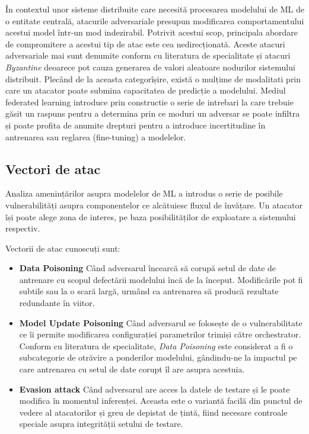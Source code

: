 \documentclass[../../main.tex]{subfiles}
\begin{document}
    În contextul unor sisteme distribuite care necesită procesarea modelului de ML de o entitate centrală, atacurile adversariale presupun modificarea comportamentului acestui model într-un mod indezirabil. Potrivit acestui scop, principala abordare de compromitere a acestui tip de atac este cea nedirecționată. 
    Aceste atacuri adversariale mai sunt denumite conform cu literatura de specialitate și atacuri \textit{Byzantine} deoarece pot cauza generarea de valori aleatoare nodurilor sistemului distribuit. 
    Plecând de la aceasta categorîșire, există o mulțime de modalitati prin care un atacator poate submina capacitatea de predicție a modelului. Mediul federated learning introduce prin constructie o serie de intrebari la care trebuie găsit un raspuns pentru a determina prin ce moduri un adversar se poate infiltra și poate profita de anumite drepturi pentru a introduce incertitudine în antrenarea sau reglarea (fine-tuning) a modelelor.

    \subsection{Vectori de atac}


	    Analiza amenințărilor asupra modelelor de ML a introdus o serie de posibile vulnerabilități asupra componentelor ce alcătuiesc fluxul de învățare.
	    Un atacator își poate alege zona de interes, pe baza posibilităților de exploatare a sistemului respectiv.

	    Vectorii de atac cunoscuți sunt:

    \begin{itemize}
        \item \textbf{Data Poisoning}
	        Când adversarul încearcă să corupă setul de date de antrenare cu scopul defectării modelului încă de la început. Modificările pot fi subtile sau la o scară largă, urmând ca antrenarea să producă rezultate redundante în viitor. 
        \item \textbf{Model Update Poisoning}
	        Când adversarul se folosește de o vulnerabilitate ce îi permite modificarea configurației parametrilor trimiși către orchestrator. Conform cu literatura de specialitate, \textit{Data Poisoning} este considerat a fi o subcategorie de otrăvire a ponderilor modelului, gândindu-ne la impactul pe care antrenarea cu setul de date corupt îl are asupra acestuia.
        \item \textbf{Evasion attack}
	        Când adversarul are acces la datele de testare și le poate modifica în momentul inferenței. Aceasta este o variantă facilă din punctul de vedere al atacatorilor și greu de depistat de țintă, fiind necesare controale speciale asupra integrității setului de testare. 
    \end{itemize}
\end{document}
